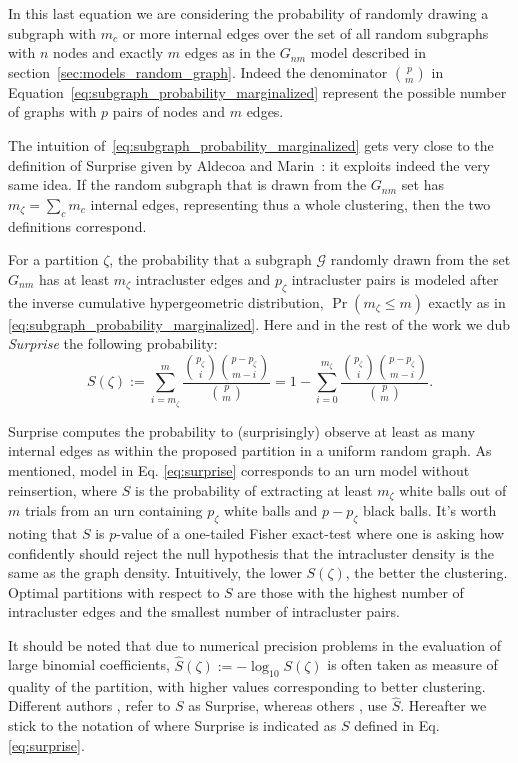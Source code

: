 In this last equation we are considering the probability of randomly drawing a subgraph with $m_c$ or more internal edges over the set of all random subgraphs with $n$ nodes and exactly $m$ edges as in the $G_{nm}$ model described in section~\ref{sec:models_random_graph}. Indeed the denominator $\binom{p}{m}$ in Equation~\ref{eq:subgraph_probability_marginalized} represent the possible number of graphs with $p$ pairs of nodes and $m$ edges. 

The intuition of~\ref{eq:subgraph_probability_marginalized} gets very close to the definition of Surprise given by Aldecoa and Marin~\cite{aldecoa2011}: it exploits indeed the very same idea. If the random subgraph that is drawn from the $G_{nm}$ set has $m_\zeta=\sum_c m_c$ internal edges, representing thus a whole clustering, then the two definitions correspond.

For a partition $\zeta$, the probability that a subgraph $\mathcal{G}$ randomly drawn from the set $G_{nm}$ has at least $m_\zeta$ intracluster edges and $p_\zeta$ intracluster pairs is modeled after the inverse cumulative hypergeometric distribution, $\Pr( m_\zeta \leq m)$ exactly as in \ref{eq:subgraph_probability_marginalized}.
Here and in the rest of the work we dub \emph{Surprise} the following probability:
\begin{equation}\label{eq:surprise}
S(\zeta) := \sum_{i = m_\zeta}^m \dfrac{\binom{p_\zeta}{i} \binom{p-p_\zeta}{m-i} }{\binom{p}{m}} = 1- \sum_{i = 0}^{m_\zeta} \dfrac{\binom{p_\zeta}{i} \binom{p-p_\zeta}{m-i} }{\binom{p}{m}}.
\end{equation}

Surprise computes the probability to (surprisingly) observe at least as many internal edges as within the proposed partition in a uniform random graph.
As mentioned, model in Eq. \ref{eq:surprise}  corresponds to an urn model without reinsertion, where $S$ is the probability of extracting at least $m_\zeta$ white balls out of $m$ trials from an urn containing $p_\zeta$ white balls and $p-p_\zeta$ black balls.
It's worth noting that $S$ is $p$-value of a one-tailed Fisher exact-test where one is asking how confidently should reject the null hypothesis that the intracluster density is the same as the graph density.
Intuitively, the lower $S(\zeta)$, the better the clustering. Optimal partitions with respect to $S$ are those with the highest number of intracluster edges and the smallest number of intracluster pairs.

It should be noted that due to numerical precision problems in the evaluation of large binomial coefficients, $\hat{S}(\zeta) := -\log_{10}S(\zeta)$ is often taken as measure of quality of the partition, with higher values corresponding to better clustering. Different authors \cite{ArnauVMarsS2005}, \cite{Fleck2014} refer to $S$ as Surprise, whereas others \cite{aldecoa2011}, \cite{Aldecoa2013} use $\hat{S}$. Hereafter we stick to the notation of \cite{Fleck2014} where Surprise is indicated as $S$ defined in Eq. \ref{eq:surprise}.

